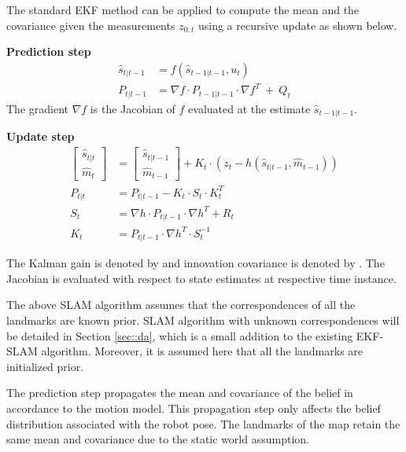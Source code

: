 The standard EKF method can be applied to compute the mean  and the covariance  given the measurements $z_{0:t}$ using a recursive update as shown below.

\textbf{Prediction step}
\begin{align}
\hat{s}_{t|t-1}&=f(\hat{s}_{t-1|t-1},u_t) \\
P_{t|t-1}&=\nabla f\cdot P_{t-1|t-1}\cdot\nabla f^T~+~Q_t
\end{align}
The gradient $\nabla f$ is the Jacobian of $f$ evaluated at the estimate $\hat{s}_{t-1|t-1}$.

\textbf{Update step}
\begin{align}
\begin{bmatrix} \hat{s}_{t|t} \\ \hat{m}_t \end{bmatrix}&=\begin{bmatrix} \hat{s}_{t|t-1} \\ \hat{m}_{t-1} \end{bmatrix}+K_t\cdot\left(z_t-h(\hat{s}_{t|t-1},\hat{m}_{t-1})\right) \\
P_{t|t}&=P_{t|t-1}-K_t\cdot S_t\cdot K^T_t \\
S_t&=\nabla h\cdot P_{t|t-1}\cdot \nabla h^T+R_t \\
K_t&=P_{t|t-1}\cdot\nabla h^T\cdot S^{-1}_t
\end{align}

The Kalman gain is denoted by  and innovation covariance is denoted by . The Jacobian  is evaluated with respect to state estimates at respective time instance. 

The above SLAM algorithm assumes that the correspondences of all the landmarks are known prior. SLAM algorithm with unknown correspondences will be detailed in Section \ref{sec::da}, which is a small addition to the existing EKF-SLAM algorithm. Moreover, it is assumed here that all the landmarks are initialized prior.

The prediction step propagates the mean and covariance of the belief in accordance to the motion model. This propagation step only affects the belief distribution associated with the robot pose. The landmarks of the map retain the same mean and covariance due to the static world assumption. 

